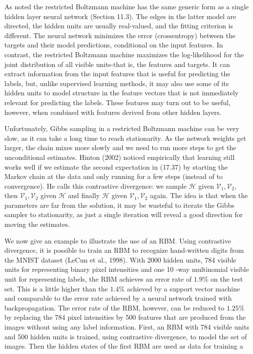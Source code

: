 \documentclass[10pt]{article}
\begin{document}
As noted the restricted Boltzmann machine has the same generic form as a single hidden layer neural network (Section 11.3). The edges in the latter model are directed, the hidden units are usually real-valued, and the fitting criterion is different. The neural network minimizes the error (crossentropy) between the targets and their model predictions, conditional on the input features. In contrast, the restricted Boltzmann machine maximizes the log-likelihood for the joint distribution of all visible units-that is, the features and targets. It can extract information from the input features that is useful for predicting the labels, but, unlike supervised learning methods, it may also use some of its hidden units to model structure in the feature vectors that is not immediately relevant for predicting the labels. These features may turn out to be useful, however, when combined with features derived from other hidden layers.

Unfortunately, Gibbs sampling in a restricted Boltzmann machine can be very slow, as it can take a long time to reach stationarity. As the network weights get larger, the chain mixes more slowly and we need to run more steps to get the unconditional estimates. Hinton (2002) noticed empirically that learning still works well if we estimate the second expectation in (17.37) by starting the Markov chain at the data and only running for a few steps (instead of to convergence). He calls this contrastive divergence: we sample $\mathcal{H}$ given $\mathcal{V}_{1}, \mathcal{V}_{2}$, then $\mathcal{V}_{1}, \mathcal{V}_{2}$ given $\mathcal{H}$ and finally $\mathcal{H}$ given $\mathcal{V}_{1}, \mathcal{V}_{2}$ again. The idea is that when the parameters are far from the solution, it may be wasteful to iterate the Gibbs sampler to stationarity, as just a single iteration will reveal a good direction for moving the estimates.

We now give an example to illustrate the use of an RBM. Using contrastive divergence, it is possible to train an RBM to recognize hand-written digits from the MNIST dataset (LeCun et al., 1998). With 2000 hidden units, 784 visible units for representing binary pixel intensities and one 10 -way multinomial visible unit for representing labels, the RBM achieves an error rate of $1.9 \%$ on the test set. This is a little higher than the $1.4 \%$ achieved by a support vector machine and comparable to the error rate achieved by a neural network trained with backpropagation. The error rate of the RBM, however, can be reduced to $1.25 \%$ by replacing the 784 pixel intensities by 500 features that are produced from the images without using any label information. First, an RBM with 784 visible units and 500 hidden units is trained, using contrastive divergence, to model the set of images. Then the hidden states of the first RBM are used as data for training a
\end{document}
